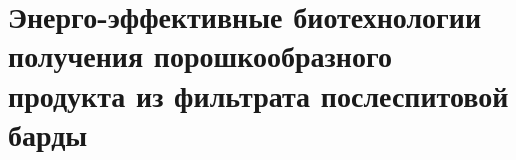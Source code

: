 \chapter{Энерго-эффективные биотехнологии получения порошкообразного продукта из фильтрата послеспитовой барды}


